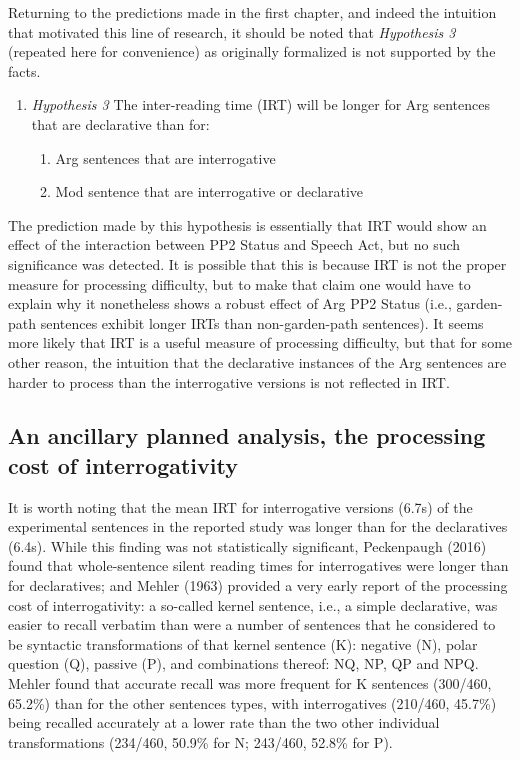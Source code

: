 \documentclass[11pt,oneside]{book}
\providecommand{\tightlist}{%
  \setlength{\itemsep}{0pt}\setlength{\parskip}{0pt}}
\begin{document}
Returning to the predictions made in the first chapter, and indeed the intuition that motivated this line of research, it should be noted that \emph{Hypothesis 3} (repeated here for convenience) as originally formalized is not supported by the facts.

\begin{enumerate}
\def\labelenumi{(\arabic{enumi})}
\setcounter{enumi}{43}
\tightlist
\item
  \emph{Hypothesis 3}
  The inter-reading time (IRT) will be longer for Arg sentences that are declarative than for:

  \begin{enumerate}
  \def\labelenumii{\alph{enumii}.}
  \tightlist
  \item
    Arg sentences that are interrogative
  \item
    Mod sentence that are interrogative or declarative
  \end{enumerate}
\end{enumerate}

The prediction made by this hypothesis is essentially that IRT would show an effect of the interaction between PP2 Status and Speech Act, but no such significance was detected. It is possible that this is because IRT is not the proper measure for processing difficulty, but to make that claim one would have to explain why it nonetheless shows a robust effect of Arg PP2 Status (i.e., garden-path sentences exhibit longer IRTs than non-garden-path sentences). It seems more likely that IRT is a useful measure of processing difficulty, but that for some other reason, the intuition that the declarative instances of the Arg sentences are harder to process than the interrogative versions is not reflected in IRT.

\hypertarget{qslow}{%
\subsection{An ancillary planned analysis, the processing cost of interrogativity}\label{qslow}}

It is worth noting that the mean IRT for interrogative versions (6.7s) of the experimental sentences in the reported study was longer than for the declaratives (6.4s). While this finding was not statistically significant, Peckenpaugh (2016) found that whole-sentence silent reading times for interrogatives were longer than for declaratives; and Mehler (1963) provided a very early report of the processing cost of interrogativity: a so-called kernel sentence, i.e., a simple declarative, was easier to recall verbatim than were a number of sentences that he considered to be syntactic transformations of that kernel sentence (K): negative (N), polar question (Q), passive (P), and combinations thereof: NQ, NP, QP and NPQ. Mehler found that accurate recall was more frequent for K sentences (300/460, 65.2\%) than for the other sentences types, with interrogatives (210/460, 45.7\%) being recalled accurately at a lower rate than the two other individual transformations (234/460, 50.9\% for N; 243/460, 52.8\% for P).
\end{document}
